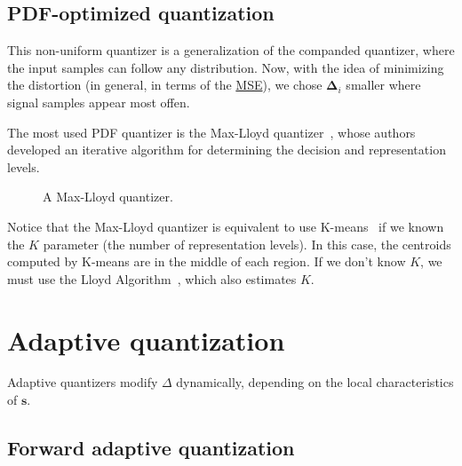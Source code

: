 
\subsection{PDF-optimized quantization}

This non-uniform quantizer is a generalization of the companded
quantizer, where the input samples can follow any distribution. Now,
with the idea of minimizing the distortion (in general, in terms of
the \href{https://en.wikipedia.org/wiki/Mean_squared_error}{MSE}), we
chose ${\mathbf\Delta}_i$ smaller where signal samples appear most
offen.

The most used PDF quantizer is the Max-Lloyd
quantizer~\cite{lloyd1982least}, whose authors developed an iterative
algorithm for determining the decision and representation levels.

\begin{figure}
  \centering
  \caption{A Max-Lloyd quantizer.}
  \label{fig:Max-Lloyd}
\end{figure}

Notice that the Max-Lloyd quantizer is equivalent to use
K-means~\cite{hartigan1979algorithm} if we known the $K$ parameter
(the number of representation levels). In this case, the centroids
computed by K-means are in the middle of each region. If we don't know
$K$, we must use the Lloyd Algorithm~\cite{hartigan1979algorithm},
which also estimates $K$.


\section{Adaptive quantization}

Adaptive quantizers modify $\Delta$ dynamically, depending on the local
characteristics of ${\mathbf s}$.


\subsection{Forward adaptive quantization}

